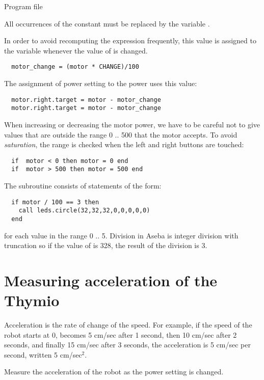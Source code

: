 {\raggedleft \hfill Program file }

All occurrences of the constant  must be replaced by the
variable .

In order to avoid recomputing the expression 
frequently, this value is assigned to the variable 
whenever the value of  is changed.

\begin{verbatim}
  motor_change = (motor * CHANGE)/100
\end{verbatim}
The assignment of power setting to the power uses this value:
\begin{verbatim}
  motor.right.target = motor - motor_change
  motor.right.target = motor - motor_change
\end{verbatim}

When increasing or decreasing the motor power, we have to be careful not
to give values that are outside the range 0 .. 500 that the motor
accepts. To avoid \emph{saturation}, the range is checked when the
left and right buttons are touched:

\begin{verbatim}
  if  motor < 0 then motor = 0 end
  if  motor > 500 then motor = 500 end
\end{verbatim}

The subroutine  consists of statements of the form:

\begin{verbatim}
  if motor / 100 == 3 then
    call leds.circle(32,32,32,0,0,0,0,0)
  end
\end{verbatim}
for each value in the range 0 .. 5. Division in Aseba is integer
division with truncation so if the value of  is 328, the result
of the division is 3.

\section{Measuring acceleration of the Thymio}

Acceleration is the rate of change of the speed. For example, if the
speed of the robot starts at 0, becomes 5 cm/sec after 1 second, then 10
cm/sec after 2 seconds, and finally 15 cm/sec after 3 seconds, the
acceleration is 5 cm/sec per second, written 5 cm/sec$^2$.

\pagebreak[4]


Measure the acceleration of the robot as the power setting is changed.

